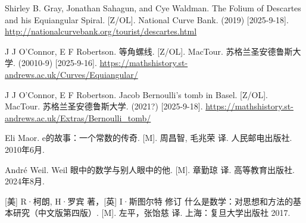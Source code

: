 Shirley B. Gray, Jonathan Sahagun, and Cye Waldman. The Folium of Descartes and his Equiangular Spiral. [Z/OL]. National Curve Bank. (2019) [2025-9-18]. \url{http://nationalcurvebank.org/tourist/descartes.html}

J J O'Connor, E F Robertson. 等角螺线. [Z/OL]. MacTour. 苏格兰圣安德鲁斯大学. (20010-9) [2025-9-16]. \url{https://mathshistory.st-andrews.ac.uk/Curves/Equiangular/}

J J O'Connor, E F Robertson. Jacob Bernoulli's tomb in Basel. [Z/OL]. MacTour. 苏格兰圣安德鲁斯大学. (2021?) [2025-9-18]. \url{https://mathshistory.st-andrews.ac.uk/Extras/Bernoulli_tomb/}

Eli Maor. e的故事：一个常数的传奇. [M]. 周昌智, 毛兆荣 译. 人民邮电出版社. 2010年6月. %

André Weil. Weil 眼中的数学与别人眼中的他. [M]. 章勤琼 译. 高等教育出版社. 2024年8月. %

[美] R·柯朗, H·罗宾 著，[英] I·斯图尔特 修订 什么是数学：对思想和方法的基本研究（中文版第四版）. [M]. 左平，张饴慈 译. 上海：复旦大学出版社 2017. %

